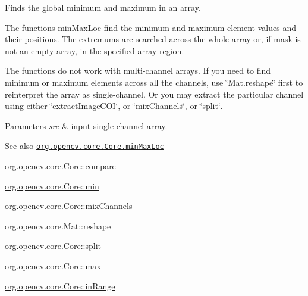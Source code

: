Finds the global minimum and maximum in an array.

The functions {\ttfamily min\+Max\+Loc} find the minimum and maximum element values and their positions. The extremums are searched across the whole array or, if {\ttfamily mask} is not an empty array, in the specified array region.

The functions do not work with multi-\/channel arrays. If you need to find minimum or maximum elements across all the channels, use \char`\"{}\+Mat.\+reshape\char`\"{} first to reinterpret the array as single-\/channel. Or you may extract the particular channel using either \char`\"{}extract\+Image\+C\+O\+I\char`\"{}, or \char`\"{}mix\+Channels\char`\"{}, or \char`\"{}split\char`\"{}.


\begin{DoxyParams}{Parameters}
{\em src} & input single-\/channel array.\\
\hline
\end{DoxyParams}
\begin{DoxySeeAlso}{See also}
\href{http://docs.opencv.org/modules/core/doc/operations_on_arrays.html#minmaxloc}{\tt org.\+opencv.\+core.\+Core.\+min\+Max\+Loc} 

\mbox{\hyperlink{classorg_1_1opencv_1_1core_1_1_core_a6f1dc64655b7da1219d82f809efb7e16}{org.\+opencv.\+core.\+Core\+::compare}} 

\mbox{\hyperlink{classorg_1_1opencv_1_1core_1_1_core_a24561bfde2c7fe7d2b7bee9d5ba8c92e}{org.\+opencv.\+core.\+Core\+::min}} 

\mbox{\hyperlink{classorg_1_1opencv_1_1core_1_1_core_a812a71941c37c615cb474bff0eacbb2e}{org.\+opencv.\+core.\+Core\+::mix\+Channels}} 

\mbox{\hyperlink{classorg_1_1opencv_1_1core_1_1_mat_ac272e7518dba0da8e7480df63163040b}{org.\+opencv.\+core.\+Mat\+::reshape}} 

\mbox{\hyperlink{classorg_1_1opencv_1_1core_1_1_core_aa22f046c4f14cda50c10f5d22ffdbb26}{org.\+opencv.\+core.\+Core\+::split}} 

\mbox{\hyperlink{classorg_1_1opencv_1_1core_1_1_core_aae8ad4feaca1ca8234bd88cbf9090cf5}{org.\+opencv.\+core.\+Core\+::max}} 

\mbox{\hyperlink{classorg_1_1opencv_1_1core_1_1_core_adda843559663a35e9a710c93b1f86096}{org.\+opencv.\+core.\+Core\+::in\+Range}} 
\end{DoxySeeAlso}
\mbox{\label{classorg_1_1opencv_1_1core_1_1_core_a812a71941c37c615cb474bff0eacbb2e}} 
